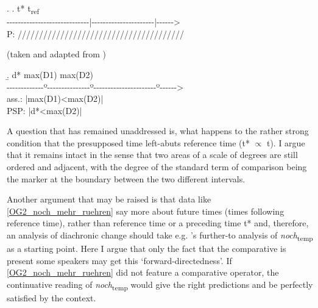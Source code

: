 \documentclass[output=paper,
modfonts
]{langscibook}
\begin{document}
\vspace{12pt}
\begin{minipage}{.9\textwidth}
\ex.\label{diagram_temp_comp}
\a. \hspace{43} t* \hspace{80} t\textsubscript{ref}\\
{-}{-}{-}{-}{-}{-}{-}{-}{-}{-}{-}{-}{-}{-}{-}{-}{-}{-}{-}{-}{-}{-}{-}{-}{-}{-}{-}{-}{-}{|}{-}{-}{-}{-}{-}{-}{-}{-}{-}{-}{-}{-}{-}{-}{-}{-}{-}{-}{-}{-}{-}{-}{|}{-}{-}{-}{-}{-}{-}>\\
P: \hspace{40}///////////////////////////////////////\\ \begin{flushright} \vspace{-12pt} (taken and adapted from \citep{beck2016a_sub})\end{flushright}\vspace{6pt}
\b. \hspace{43} d* \hspace{30} max(D1) \hspace{42} max(D2)\\
{-}{-}{-}{-}{-}{-}{-}{-}{-}{-}{-}{-}{-}{º}{-}{-}{-}{-}{-}{-}{-}{-}{-}{-}{-}{-}{-}{-}{-}{º}{-}{-}{-}{-}{-}{-}{-}{-}{-}{-}{-}{-}{-}{-}{-}{-}{-}{-}{-}{-}{-}{-}{º}{-}{-}{-}{-}{-}{-}>\\
ass.: \hspace{85}|\hspace{1.125}max(D1)<max(D2)\hspace{1.125}|\\
PSP: \hspace{25}|\hspace{1}d*<max(D2)\hspace{1}|

\end{minipage} \vspace{12pt}

A question that has remained unaddressed is, what happens to the rather strong condition that the presupposed time left-abuts reference time (t* $\propto$ t). I argue that it remains intact in the sense that two areas of a scale of degrees are still ordered and adjacent, with the degree of the standard term of comparison being the marker at the boundary between the two different intervals.

Another argument that may be raised is that data like \ref{OG2_noch_mehr_ruehren} say more about future times (times following reference time), rather than reference time or a preceding time t* and, therefore, an analysis of diachronic change should take e.g. \citeauthor{beck2016a_sub}'s \citeyearpar{beck2016a_sub} further-to analysis of \textit{noch}\textsubscript{temp} as a starting point. Here I argue that only the fact that the comparative is present some speakers may get this `forward-directedness'. If \ref{OG2_noch_mehr_ruehren} did not feature a comparative operator, the continuative reading of \textit{noch}\textsubscript{temp} would give the right predictions and be perfectly satisfied by the context. 
\end{document}
